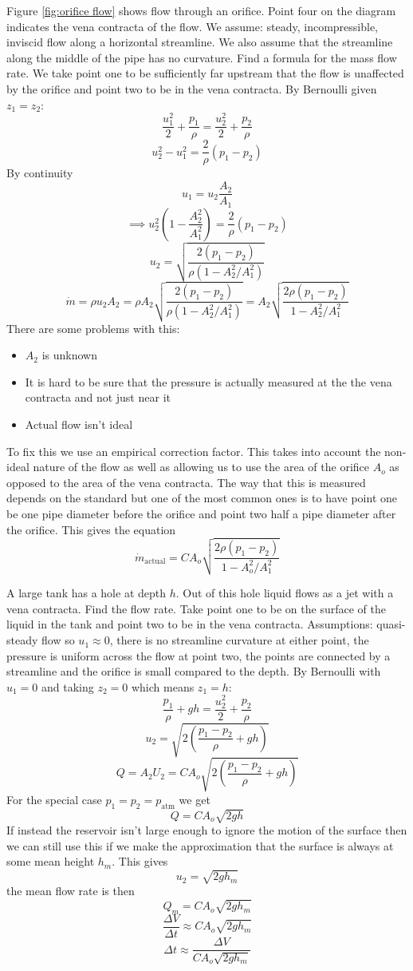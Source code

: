 \documentclass{article}
\begin{document}
    Figure \ref{fig:orifice flow} shows flow through an orifice. 
    Point four on the diagram indicates the vena contracta of the flow.
    We assume: steady, incompressible, inviscid flow along a horizontal streamline.
    We also assume that the streamline along the middle of the pipe has no curvature.
    Find a formula for the mass flow rate.
    We take point one to be sufficiently far upstream that the flow is unaffected by the orifice and point two to be in the vena contracta.
    By Bernoulli given \(z_1 = z_2\):
    \[\frac{u_1^2}{2} + \frac{p_1}{\rho} = \frac{u_2^2}{2} + \frac{p_2}{\rho}\]
    \[u_2^2 - u_1^2 = \frac{2}{\rho}(p_1 - p_2)\]
    By continuity
    \[u_1 = u_2\frac{A_2}{A_1}\]
    \[\implies u_2^2\left(1 - \frac{A_2^2}{A_1^2}\right) = \frac{2}{\rho}(p_1 - p_2)\]
    \[u_2 = \sqrt{\frac{2(p_1 - p_2)}{\rho(1 - A_2^2/A_1^2)}}\]
    \[\dot m = \rho u_2 A_2 = \rho A_2\sqrt{\frac{2(p_1 - p_2)}{\rho(1 - A_2^2/A_1^2)}} = A_2\sqrt{\frac{2\rho(p_1 - p_2)}{1 - A_2^2/A_1^2}}\]
    There are some problems with this:
    \begin{itemize}
        \item \(A_2\) is unknown
        \item It is hard to be sure that the pressure is actually measured at the the vena contracta and not just near it
        \item Actual flow isn't ideal
    \end{itemize}
    To fix this we use an empirical correction factor.
    This takes into account the non-ideal nature of the flow as well as allowing us to use the area of the orifice \(A_o\) as opposed to the area of the vena contracta.
    The way that this is measured depends on the standard but one of the most common ones is to have point one be one pipe diameter before the orifice and point two half a pipe diameter after the orifice.
    This gives the equation
    \[\dot m_\text{actual} = CA_o\sqrt{\frac{2\rho(p_1 - p_2)}{1 - A_o^2/A_1^2}}\]
    
    \example
    A large tank has a hole at depth \(h\).
    Out of this hole liquid flows as a jet with a vena contracta. 
    Find the flow rate.
    Take point one to be on the surface of the liquid in the tank and point two to be in the vena contracta.
    Assumptions: quasi-steady flow so \(u_1 \approx 0\), there is no streamline curvature at either point, the pressure is uniform across the flow at point two, the points are connected by a streamline and the orifice is small compared to the depth.
    By Bernoulli with \(u_1 = 0\) and taking \(z_2 = 0\) which means \(z_1 = h\):
    \[\frac{p_1}{\rho} + gh = \frac{u_2^2}{2} + \frac{p_2}{\rho}\]
    \[u_2 = \sqrt{2\left(\frac{p_1 - p_2}{\rho} + gh\right)}\]
    \[Q = A_2U_2 = CA_o\sqrt{2\left(\frac{p_1 - p_2}{\rho} + gh\right)}\]
    For the special case \(p_1 = p_2 = p_\text{atm}\) we get
    \[Q = CA_o\sqrt{2gh}\]
    If instead the reservoir isn't large enough to ignore the motion of the surface then we can still use this if we make the approximation that the surface is always at some mean height \(h_m\).
    This gives
    \[u_2 = \sqrt{2gh_m}\]
    the mean flow rate is then
    \[Q_m = CA_o\sqrt{2gh_m}\]
    \[\frac{\Delta V}{\Delta t}\approx CA_o\sqrt{2gh_m}\]
    \[\Delta t \approx \frac{\Delta V}{CA_o\sqrt{2gh_m}}\]
\end{document}
